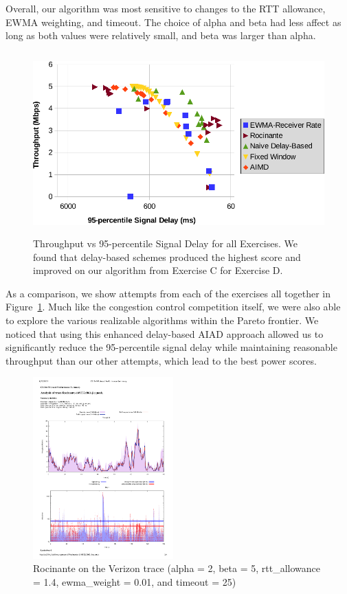 \documentclass[twoside]{article}
\begin{document}
Overall, our algorithm was most sensitive to changes to the RTT allowance, EWMA
weighting, and timeout. The choice of alpha and beta had less affect as long as
both values were relatively small, and beta was larger than alpha.

\begin{figure}[h]
  \centering
  \includegraphics[height=7cm]{./img/total.pdf}
  \caption{Throughput vs 95-percentile Signal Delay for all Exercises.
  We found that delay-based schemes produced the highest score and improved
  on our algorithm from Exercise C for Exercise D.}
  \label{fig:all_attempts}
\end{figure}

As a comparison, we show attempts from each of the exercises all together in
Figure~\ref{fig:all_attempts}. Much like the congestion control competition
itself, we were also able to explore the various realizable algorithms within
the Pareto frontier. We noticed that using this enhanced delay-based AIAD
approach allowed us to significantly reduce the 95-percentile signal delay
while maintaining reasonable throughput than our other attempts, which lead
to the best power scores.

\pagebreak

\begin{figure}[t]
  \centering
  \includegraphics[height=7cm, clip, trim={1cm 12cm 1cm 6cm}]{./img/final_trace.pdf}
  \caption{Rocinante on the Verizon trace (alpha = 2, beta = 5,
    rtt\_allowance = 1.4, ewma\_weight = 0.01, and timeout = 25)
  }
  \label{fig:final_trace}
\end{figure}
\end{document}
